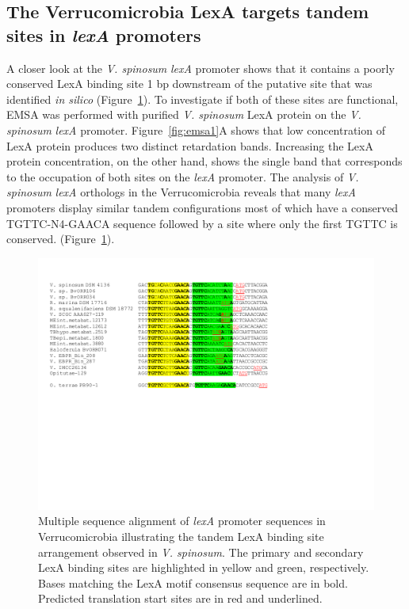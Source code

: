 \subsection{The Verrucomicrobia LexA targets tandem sites in \textit{lexA}
  promoters}

A closer look at the \textit{V. spinosum} \textit{lexA} promoter shows that it
contains a poorly conserved LexA binding site 1 bp downstream of the putative
site that was identified \textit{in silico} (Figure~\ref{fig:lexa-tandem}). To
investigate if both of these sites are functional, EMSA was performed with
purified \textit{V. spinosum} LexA protein on the \textit{V. spinosum}
\textit{lexA} promoter. Figure~\ref{fig:emsa1}A shows that low concentration of
LexA protein produces two distinct retardation bands. Increasing the LexA
protein concentration, on the other hand, shows the single band that
corresponds to the occupation of both sites on the \textit{lexA} promoter. The
analysis of \textit{V. spinosum} \textit{lexA} orthologs in the Verrucomicrobia
reveals that many \textit{lexA} promoters display similar tandem configurations
most of which have a conserved TGTTC-N4-GAACA sequence followed by a site where
only the first TGTTC is conserved. (Figure~\ref{fig:lexa-tandem}).

\begin{figure}
  \centering
  \includegraphics[width=\textwidth]{figures/chapter5/tandem}
  \caption{Multiple sequence alignment of \textit{lexA} promoter sequences in
    Verrucomicrobia illustrating the tandem LexA binding site arrangement
    observed in \textit{V. spinosum}. The primary and secondary LexA binding
    sites are highlighted in yellow and green, respectively. Bases matching the
    LexA motif consensus sequence are in bold. Predicted translation start
    sites are in red and underlined.}
  \label{fig:lexa-tandem}
\end{figure}

